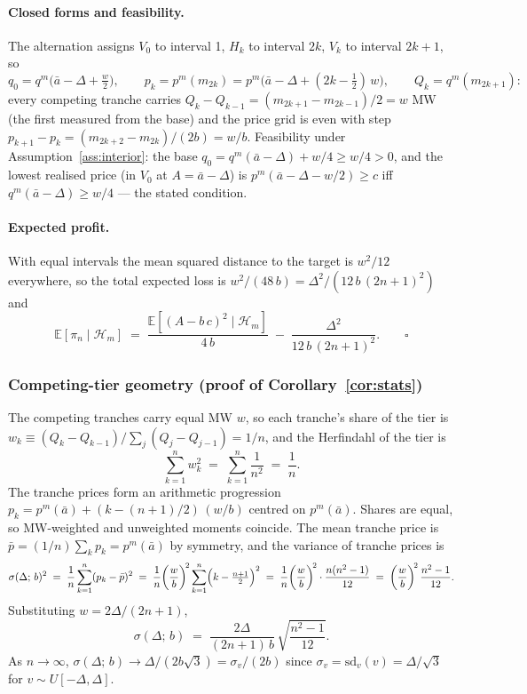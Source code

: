 \documentclass[11pt,a4paper]{article}
\theoremstyle{definition}
\theoremstyle{remark}
\theoremstyle{plain}
\begin{document}
\paragraph{Closed forms and feasibility.} The alternation assigns $V_0$ to interval 1, $H_k$ to interval $2k$, $V_k$ to interval $2k{+}1$, so
\[
q_0 = q^m\!\bigl(\bar a - \Delta + \tfrac{w}{2}\bigr), \qquad
p_k = p^m(m_{2k}) = p^m\!\bigl(\bar a - \Delta + (2k - \tfrac12)\,w\bigr), \qquad
Q_k = q^m(m_{2k+1}):
\]
every competing tranche carries $Q_k - Q_{k-1} = (m_{2k+1} - m_{2k-1})/2 = w$ MW (the first measured from the base) and the price grid is even with step $p_{k+1} - p_k = (m_{2k+2} - m_{2k})/(2b) = w/b$. Feasibility under Assumption~\ref{ass:interior}: the base $q_0 = q^m(\bar a - \Delta) + w/4 \ge w/4 > 0$, and the lowest realised price (in $V_0$ at $A = \bar a - \Delta$) is $p^m(\bar a - \Delta - w/2) \ge c$ iff $q^m(\bar a - \Delta) \ge w/4$ --- the stated condition.

\paragraph{Expected profit.} With equal intervals the mean squared distance to the target is $w^2/12$ everywhere, so the total expected loss is $w^2/(48\, b) = \Delta^2/(12\,b\,(2n+1)^2)$ and
\[
\mathbb{E}[\pi_n \mid \mathcal{H}_m] \;=\; \frac{\mathbb{E}[(A - b\,c)^2 \mid \mathcal{H}_m]}{4\,b} \;-\; \frac{\Delta^2}{12\,b\,(2n+1)^2}. \qquad \square
\]

\subsubsection{Competing-tier geometry (proof of Corollary~\ref{cor:stats})}\label{app:tranche:stats}

The competing tranches carry equal MW $w$, so each tranche's share of the tier is $w_k \equiv (Q_k - Q_{k-1}) / \sum_j (Q_j - Q_{j-1}) = 1/n$, and the Herfindahl of the tier is
\[
\sum_{k=1}^n w_k^2 \;=\; \sum_{k=1}^n \frac{1}{n^2} \;=\; \frac{1}{n}.
\]
The tranche prices form an arithmetic progression $p_k = p^m(\bar a) + (k - (n+1)/2)\,(w/b)$ centred on $p^m(\bar a)$. Shares are equal, so MW-weighted and unweighted moments coincide. The mean tranche price is $\bar p = (1/n)\sum_k p_k = p^m(\bar a)$ by symmetry, and the variance of tranche prices is
\[
\sigma(\Delta;\,b)^2 \;=\; \frac{1}{n}\sum_{k=1}^n (p_k - \bar p)^2 \;=\; \frac{1}{n}\bigg(\frac{w}{b}\bigg)^{\!2}\sum_{k=1}^n \Bigl(k - \tfrac{n+1}{2}\Bigr)^2 \;=\; \frac{1}{n}\bigg(\frac{w}{b}\bigg)^{\!2} \cdot \frac{n(n^2-1)}{12} \;=\; \bigg(\frac{w}{b}\bigg)^{\!2}\,\frac{n^2-1}{12}.
\]
Substituting $w = 2\Delta/(2n+1)$,
\[
\sigma(\Delta;\,b) \;=\; \frac{2\Delta}{(2n+1)\,b}\,\sqrt{\frac{n^2-1}{12}}.
\]
As $n \to \infty$, $\sigma(\Delta;\,b) \to \Delta/(2 b\sqrt{3}) = \sigma_v/(2 b)$ since $\sigma_v = \mathrm{sd}_v(v) = \Delta/\sqrt{3}$ for $v \sim U[-\Delta, \Delta]$.
\end{document}
